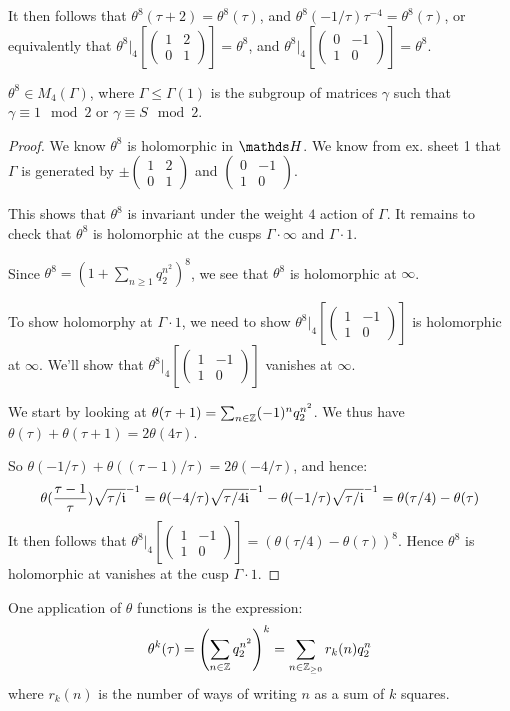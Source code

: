\documentclass[10pt,a4paper]{article}
\begin{document}
It then follows that $\theta^8(\tau+ 2) =\theta^8(\tau)$, and $\theta^8(-1/\tau)\tau^{-4} = \theta^8(\tau)$, or equivalently that $\theta^8|_{4}\left[\begin{pmatrix}1&2\\0&1\end{pmatrix}\right] = \theta^8$, and $\theta^8|_{4}\left[\begin{pmatrix}0&-1\\1&0\end{pmatrix}\right] = \theta^8$.
\begin{proposition}
  $\theta^8 \in M_4(\Gamma)$, where $\Gamma \leq \Gamma(1)$ is the subgroup of matrices $\gamma$ such that $\gamma \equiv 1 \mod 2$ or $\gamma \equiv S \mod 2$.
\end{proposition}
\begin{proof}
  We know $\theta^8$ is holomorphic in $\H$. We know from ex. sheet 1 that $\Gamma$ is generated by $\pm \begin{pmatrix}1&2\\0&1 \end{pmatrix}$ and $\begin{pmatrix}0&-1\\1&0\end{pmatrix}$.

  This shows that $\theta^8$ is invariant under the weight $4$ action of $\Gamma$. It remains to check that $\theta^8$ is holomorphic at the cusps $\Gamma \cdot \infty$ and $\Gamma \cdot 1$.

  Since $\theta^8 = \left(1 + \sum_{n\geq 1}q_2^{n^2}\right)^8$, we see that $\theta^8$ is holomorphic at $\infty$.

  To show holomorphy at $\Gamma \cdot 1$, we need to show $\theta^8|_{4}\left[\begin{pmatrix}1&-1\\1&0\end{pmatrix}\right]$ is holomorphic at $\infty$. We'll show that $\theta^8|_{4}\left[\begin{pmatrix}1&-1\\1&0\end{pmatrix}\right]$ vanishes at $\infty$.

  We start by looking at $\theta(\tau+1) = \sum_{n \in \mathbb{Z}}(-1)^n q_2^{n^2}$. We thus have $\theta(\tau) + \theta(\tau+1) = 2\theta(4\tau)$.

  So $\theta(-1/\tau) + \theta((\tau-1)/\tau) = 2\theta(-4/\tau)$, and hence:
  \[\theta(\frac{\tau-1}{\tau})\sqrt{\tau/\mathfrak{i}}^{-1} = \theta(-4/\tau)\sqrt{\tau/4\mathfrak{i}}^{-1} - \theta(-1/\tau)\sqrt{\tau/\mathfrak{i}}^{-1} = \theta(\tau/4) - \theta(\tau)\]
  It then follows that $\theta^8|_{4}\left[\begin{pmatrix}1&-1\\1&0\end{pmatrix}\right] = (\theta(\tau/4)-\theta(\tau))^8$. Hence $\theta^8$ is holomorphic at vanishes at the cusp $\Gamma \cdot 1$.
\end{proof}
One application of $\theta$ functions is the expression:
\[\theta^k(\tau)  = \left(\sum_{n \in \mathbb{Z}}q_2^{n^2}\right)^k = \sum_{n \in \mathbb{Z}_{\geq 0}}r_k(n)q_2^n\]
where $r_k(n)$ is the number of ways of writing $n$ as a sum of $k$ squares.
\end{document}
